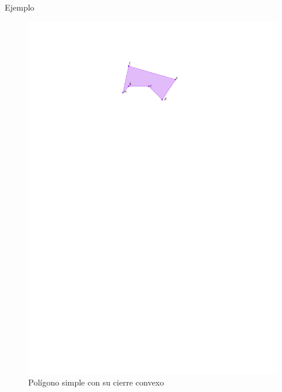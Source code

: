 \documentclass[aspectratio=169,xcolor=dvipsnames, t]{beamer}
\begin{document}
\begin{frame}{Ejemplo}
  \begin{figure}
    \centering
    \includegraphics[width=\linewidth, height=0.5\textheight, page=2, keepaspectratio]{IPE/Melkman.pdf}
    \caption{Polígono simple con su cierre convexo}
  \end{figure}
\end{frame}
\end{document}
